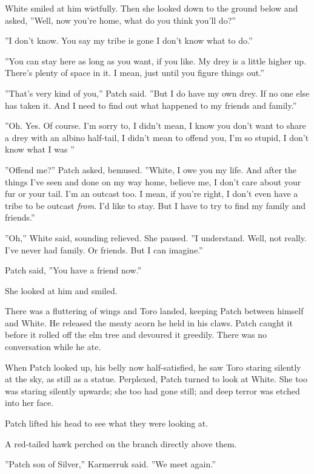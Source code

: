 \documentclass[12pt]{book}
\begin{document}
 White smiled at him wistfully. Then she looked down to the ground below and asked, ''Well, now you're home, what do you think you'll do?''\par
 ''I don't know. You say my tribe is gone %
 I don't know what to do.''\par
 ''You can stay here as long as you want, if you like. My drey is a little higher up. There's plenty of space in it. I mean, just until you figure things out.''\par
 ''That's very kind of you,'' Patch said. ''But I do have my own drey. If no one else has taken it. And I need to find out what happened to my friends and family.''\par
 ''Oh. Yes. Of course. I'm sorry to, I didn't mean, I know you don't want to share a drey with an albino half-tail, I didn't mean to offend you, I'm so stupid, I don't know what I was %
''\par
 ''Offend me?'' Patch asked, bemused. ''White, I owe you my life. And after the things I've seen and done on my way home, believe me, I don't care about your fur or your tail. I'm an outcast too. I mean, if you're right, I don't even have a tribe to be outcast {\it from}. I'd like to stay. But I have to try to find my family and friends.''\par
 ''Oh,'' White said, sounding relieved. She paused. ''I understand. Well, not really. I've never had family. Or friends. But I can imagine.''\par
 Patch said, ''You have a friend now.''\par
 She looked at him and smiled.\par
 There was a fluttering of wings and Toro landed, keeping Patch between himself and White. He released the meaty acorn he held in his claws. Patch caught it before it rolled off the elm tree and devoured it greedily. There was no conversation while he ate.\par
When Patch looked up, his belly now half-satisfied, he saw Toro staring silently at the sky, as still as a statue. Perplexed, Patch turned to look at White. She too was staring silently upwards; she too had gone still; and deep terror was etched into her face.\par
 Patch lifted his head to see what they were looking at.\par
 A red-tailed hawk perched on the branch directly above them.\par
 ''Patch son of Silver,'' Karmerruk said. ''We meet again.''\par
\end{document}
